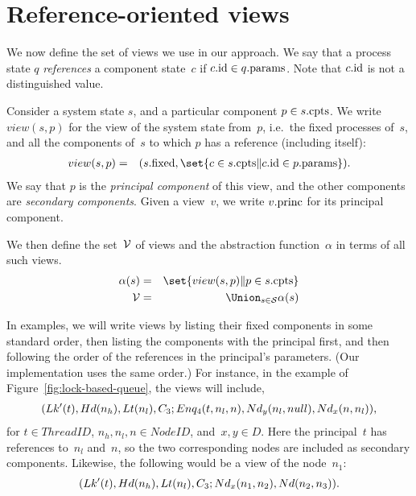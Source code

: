 \section{Reference-oriented views}
\label{sec:views}

We now define the set of views we use in our approach.  We say that a process
state $q$ \emph{references} a component state~$c$ if $c.\mathrm{id} \in q.\mathrm{params}$.
Note that $c.\mathrm{id}$ is not a distinguished value.

Consider a system state $s$, and a particular component $p \in s.\mathrm{cpts}$.  We
write $view(s, p)$ for the view of the system state from~$p$, i.e.~the
fixed processes of~$s$, and all the components of~$s$ to which $p$ has a
reference (including itself):
%
%
\begin{eqnarray*}
view(s, p) & = &
  (s.\fixed, \set{c \in s.\cpts \| c.\id \in p.\params}).
\end{eqnarray*}
%
We say that $p$ is the \emph{principal component} of this view, and the
other components are \emph{secondary components}.  Given a view~$v$, we write
$v.\mathrm{princ}$ for its principal component. 

We then define the set~$\mathcal{V}$ of views and the abstraction function~$\alpha$ in
terms of all such views.
%
\begin{eqnarray*}
\alpha(s) & = & \set{ view(s, p) \| p \in s.\cpts } \\
\V & = & \Union_{s \in \S} \alpha(s)
\end{eqnarray*}

In examples, we will write views by listing their fixed components in some
standard order, then listing the components with the principal first, and then
following the order of the references in the principal's parameters.  (Our
implementation uses the same order.)  For instance, in the example of
Figure~\ref{fig:lock-based-queue}, the views will include,
\[
\begin{align}
(Lk'(t), Hd(n_h), Lt(n_l), C_3; 
  Enq_4(t, n_l, n), Nd_y(n_l, null),Nd_x(n, n_l)),
\end{align}
\]
for $t \in ThreadID$, $n_h, n_l, n \in NodeID$, and~$x, y \in D$.  Here the
principal~$t$ has references to~$n_l$ and~$n$, so the two corresponding nodes
are included as secondary components.
Likewise, the following would be a view of the node~$n_1$:
\[
(Lk'(t), Hd(n_h), Lt(n_l), C_3; Nd_x(n_1, n_2), Nd(n_2, n_3)).
\]

